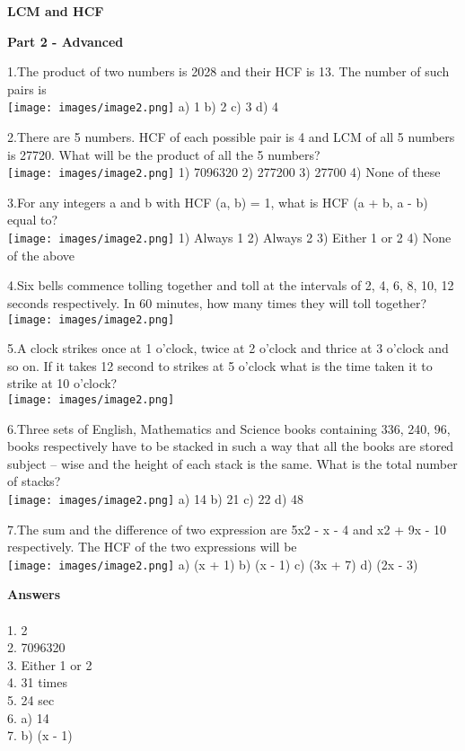 \documentclass[
]{article}
\author{}
\date{}
\begin{document}
	

\begin{center}
	{\Large \textbf{LCM and HCF \\}}
\end{center}

{\large \textbf{Part 2 - Advanced \\}}

1.The product of two numbers is 2028 and their HCF is 13. The number of such pairs is \\
\texttt{[image: images/image2.png]}  a) 1 	b) 2 	c) 3 	d) 4

2.There are 5 numbers. HCF of each possible pair is 4 and LCM of all 5 numbers is 27720. What will be the product of all the 5 numbers? \\
\texttt{[image: images/image2.png]} 1) 7096320 	2) 277200 	3) 27700 4) None of these

3.For any integers a and b with HCF (a, b) = 1, what is HCF (a + b, a - b) equal to? \\
\texttt{[image: images/image2.png]} 1) Always 1 	2) Always 2 	3) Either 1 or 2 	4) None of the above

4.Six bells commence tolling together and toll at the intervals of 2, 4, 6, 8, 10, 12 seconds respectively. In 60 minutes, how many times they will toll together?\\
\texttt{[image: images/image2.png]} 

5.A clock strikes once at 1 o'clock, twice at 2 o'clock and thrice at 3 o'clock and so on. If it takes 12 second to strikes at 5 o'clock what is the time taken it to strike at 10 o'clock?\\
\texttt{[image: images/image2.png]} 

6.Three sets of English, Mathematics and Science books containing 336, 240, 96, books respectively have to be stacked in such a way that all the books are stored subject – wise and 	the height of each stack is the same. What is the total number of stacks? \\
\texttt{[image: images/image2.png]} a) 14 	b) 21 	c) 22 	d) 48

7.The sum and the difference of two expression are 5x2 - x - 4 and x2 + 9x - 10 respectively. The HCF of the two expressions will be  \\
\texttt{[image: images/image2.png]} 	a) (x + 1) 	b) (x - 1) 	c) (3x + 7) 	d) (2x - 3)
\newpage

{\large \textbf{Answers \\}}
\\ 1. 2 \\
2. 7096320 \\
3. Either 1 or 2 \\
4. 31 times \\
5. 24 sec \\
6. a) 14 \\
7. b) (x - 1) \\
\end{document}
